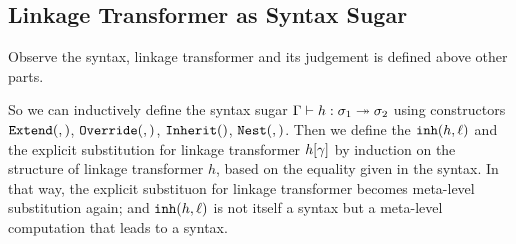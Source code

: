 \subsection{Linkage Transformer as Syntax Sugar}
Observe the syntax, linkage transformer and its judgement is defined above 
other parts. 

So we can inductively define the syntax sugar $ {\Gamma} \vdash {h} : {\sigma_1} \twoheadrightarrow {\ensuremath{\sigma}_2}$ using constructors $\texttt{Extend}({},{})$, $\texttt{Override}({},{})$, $\texttt{Inherit}({})$, $\texttt{Nest}({},{})$. Then we define the $\texttt{inh}({h},{\ell})$ and the explicit substitution for linkage transformer ${h}\!\left[{\gamma}\right]$ by induction on the structure of linkage transformer $h$, based on the equality
given in the syntax. In that way, the explicit substituon for linkage transformer becomes meta-level substitution again; and $\texttt{inh}({h},{\ell})$ is not itself a syntax but a meta-level computation that leads to a syntax.